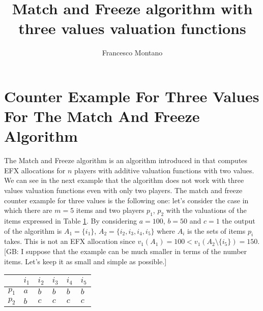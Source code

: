 \documentclass{article}
\title{Match and Freeze algorithm with three values valuation functions}
\author{Francesco Montano}
\newcommand{\gb}[1]{{\color{red}[GB: #1]}}
\begin{document}
\maketitle

\section{Counter Example For Three Values For The Match And Freeze Algorithm}
The Match and Freeze algorithm is an algorithm introduced in \cite{DBLP:journals/corr/abs-2001-09838} that computes EFX allocations for $n$ players with additive valuation functions with two values. We can see in the next example that the algorithm does not work with three values valuation functions even with only two players. The match and freeze counter example for three values is the following one: let's consider the case in which there are $m=5$ items and two players $p_1$, $p_2$ with the valuations of the items expressed in Table \ref{table:counter-example-match-and-freeze-three-values}. By considering $a = 100$, $b=50$ and $c=1$ the output of the algorithm is $A_1 = \{i_1\}$, $A_2 = \{i_2,i_3, i_4,i_5\}$ where $A_i$ is the sets of items $p_i$ takes. This is not an EFX allocation since $v_1(A_1) = 100 < v_1(A_2\setminus \{i_{5}\}) = 150$. 
\gb{I suppose that the example can be much smaller in terms of the number items. Let's keep it as small and simple as possible.}  

\begin{table}[h]
\centering
\begin{tabular}{|l|l|l|l|l|l|}
\hline
      & $i_1$ & $i_2$ & $i_3$ & $i_4$ & $i_5$ \\ \hline
$p_1$ & $a$   & $b$   & $b$   & $b$   & $b$   \\ \hline
$p_2$ & $b$   & $c$   & $c$   & $c$   & $c$   \\ \hline
\end{tabular}
\label{table:counter-example-match-and-freeze-three-values}
\end{table}
\end{document}
